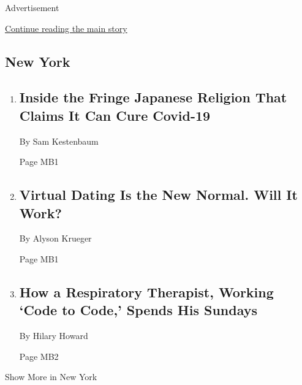 Advertisement

\protect\hyperlink{after-mid3}{Continue reading the main story}

\hypertarget{new-york}{%
\subsection{New York}\label{new-york}}

\begin{enumerate}
\def\labelenumi{\arabic{enumi}.}
\item
  \href{/article/happy-science-japan-coronavirus-cure.html}{}

  \hypertarget{inside-the-fringe-japanese-religion-that-claims-it-can-cure-covid-19}{%
  \subsection{Inside the Fringe Japanese Religion That Claims It Can
  Cure
  Covid-19}\label{inside-the-fringe-japanese-religion-that-claims-it-can-cure-covid-19}}

  By Sam Kestenbaum

  Page MB1
\item
  \href{/2020/04/18/nyregion/coronavirus-dating-video.html}{}

  \hypertarget{virtual-dating-is-the-new-normal-will-it-work}{%
  \subsection{Virtual Dating Is the New Normal. Will It
  Work?}\label{virtual-dating-is-the-new-normal-will-it-work}}

  By Alyson Krueger

  Page MB1
\item
  \href{/2020/04/17/nyregion/coronavirus-respiratory-therapist.html}{}

  \hypertarget{how-a-respiratory-therapist-working-code-to-code-spends-his-sundays}{%
  \subsection{How a Respiratory Therapist, Working `Code to Code,'
  Spends His
  Sundays}\label{how-a-respiratory-therapist-working-code-to-code-spends-his-sundays}}

  By Hilary Howard

  Page MB2
\end{enumerate}

Show More in New York

